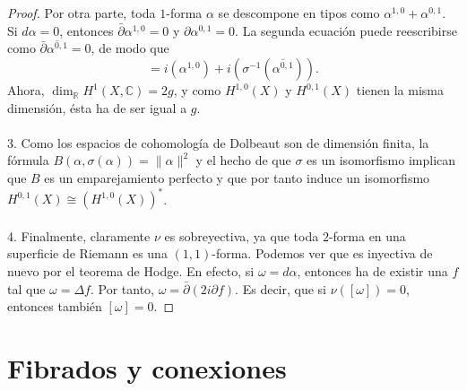 \documentclass[12pt,a4paper]{article}
\theoremstyle{definition} \newtheorem{defn}[thm]{Definición}
\theoremstyle{definition} \newtheorem{ejemplo}[thm]{Ejemplo}
\theoremstyle{definition} \newtheorem{ejercicio}[thm]{Ejercicio}
\def\CC{\mathbb{C}}
\def\RR{\mathbb{R}}
\def\delbar{\bar{\partial}}
\begin{document}
\begin{proof}
	Por otra parte, toda $1$-forma $\alpha$ se descompone en tipos como $\alpha^{1,0} + \alpha^{0,1}$. Si $d\alpha =0$, entonces $\delbar \alpha^{1,0} =0$ y $\partial \alpha^{0,1}=0$. La segunda ecuación puede reescribirse como $\delbar \overline{\alpha^{0,1}} = 0$, de modo que
	\begin{equation*}
	  [\alpha] = i(\alpha^{1,0}) + i(\sigma^{-1}(\overline{\alpha^{0,1}})).
	\end{equation*}
	Ahora, $\dim_{\RR} H^1(X,\CC) = 2g$, y como $H^{1,0}(X)$ y $H^{0,1}(X)$ tienen la misma dimensión, ésta ha de ser igual a $g$. \ \\
	\ \\
	3. Como los espacios de cohomología de Dolbeaut son de dimensión finita, la fórmula $B(\alpha, \sigma(\alpha)) = \lVert \alpha \rVert ^2$ y el hecho de que $\sigma$ es un isomorfismo implican que $B$ es un emparejamiento perfecto y que por tanto induce un isomorfismo $H^{0,1}(X) \cong (H^{1,0}(X))^*$. \ \\
	\ \\
	4. Finalmente, claramente $\nu$ es sobreyectiva, ya que toda $2$-forma en una superficie de Riemann es una $(1,1)$-forma. Podemos ver que es inyectiva de nuevo por el teorema de Hodge. En efecto, si $\omega=d\alpha$, entonces ha de existir una $f$ tal que $\omega=\Delta f$. Por tanto, $\omega = \delbar(2i\partial f)$. Es decir, que si $\nu([\omega])=0$, entonces también $[\omega]=0$.
      \end{proof}

      \section{Fibrados y conexiones}
\end{document}
